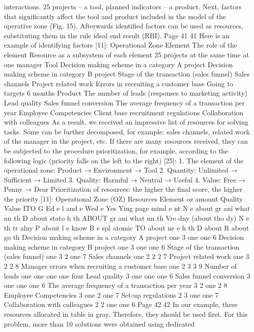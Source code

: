 interactions. 25 projects -- a tool, planned indicators -- a product.
Next, factors that significantly affect
the tool and product included in the model of the operative zone (Fig. 15). Afterwards
identified factors can be used as resources, substituting them in the rule
ideal end result (RBI).
Page 41
41
Here is an example of identifying factors [11]:
Operational Zone Element
The role of the element Resource as a subsystem of each element
25 projects at the same time
at one manager
Tool
Decision making scheme in a category A project
Decision making scheme in category B project
Stage of the transaction (sales funnel)
Sales channels
Project related work
Errors in recruiting a customer base
Going to targets 6 months
Product
The number of leads (responses to marketing
activity)
Lead quality
Sales funnel conversion
The average frequency of a transaction per year
Employee Competencies
Client base recruitment regulations
Collaboration with colleagues
As a result, we received an impressive list of resources for solving
tasks. Some can be further decomposed, for example: sales channels,
related work of the manager in the project, etc.
If there are many resources received, they can be subjected to the procedure
prioritization, for example, according to the following logic (priority falls on the left
to the right) [25]:
1. The element of the operational zone: Product → Environment → Tool
2. Quantity: Unlimited → Sufficient → Limited
3. Quality: Harmful → Neutral → Useful
4. Value: Free → Penny → Dear
Prioritization of resources: the higher the final score, the higher the priority [11]:
Operational Zone (OZ) Resources
Element oz
amount
Quality
Value
ITO
G
Ed
e
l
and
e
Wed
e
Yes
Ying
page
mind
e
nt
N
e
about
gr
ani
what
nn
th
D
about
stato
h
th
ABOUT
gr
ani
what
nn
th
Vre
dny
(about
tho
dy)
N
e
th
tr
alny
P
about
l
e
know
B
e
spl
atomic
TO
about
ne
e
h
th
D
about
R
about
go
th
Decision making scheme in a category A project
one
3
one
one
6
Decision making scheme in category B project
one
3
one
one
6
Stage of the transaction (sales funnel)
one
3
2
one
7
Sales channels
one
2
2
2
7
Project related work
one
3
2
2
8
Manager errors when recruiting a customer base
one
2
3
3
9
Number of leads
one
one
one
one
four
Lead quality
3
one
one
one
6
Sales funnel conversion
3
one
one
one
6
The average frequency of a transaction per year
3
2
one
2
8
Employee Competencies
3
one
2
one
7
Set-up regulations
2
3
one
one
7
Collaboration with colleagues
2
2
one
one
6
Page 42
42
In our example, three resources allocated in
table in gray. Therefore, they should be used first.
For this problem, more than 10 solutions were obtained using dedicated
